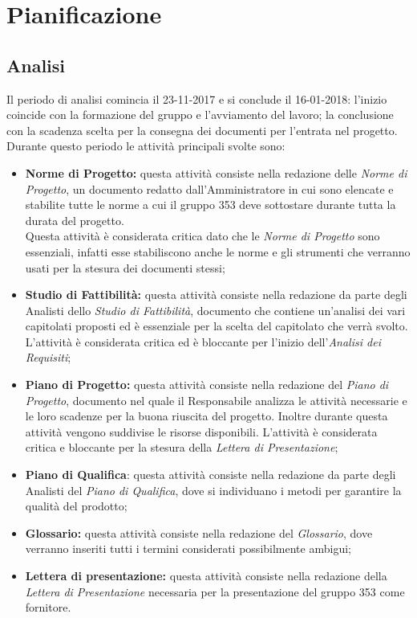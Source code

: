 \documentclass[PianoDiProgetto.tex]{subfiles}
\begin{document}
\chapter{Pianificazione}

\section{Analisi}
Il periodo di analisi comincia il 23-11-2017 e si conclude il 16-01-2018: l'inizio coincide con la formazione del gruppo e l'avviamento del lavoro; la conclusione con la scadenza scelta per la consegna dei documenti per l'entrata nel progetto. Durante questo periodo le attività principali svolte sono:
\begin{itemize}
	\item \textbf{Norme di Progetto:} questa attività consiste nella redazione delle \textit{Norme di Progetto}, un documento redatto dall'Amministratore in cui sono elencate e stabilite tutte le norme a cui il gruppo 353 deve sottostare durante tutta la durata del progetto.\\ 
	Questa attività è considerata critica dato che le \textit{Norme di Progetto} sono essenziali, infatti esse stabiliscono anche le norme e gli strumenti che verranno usati per la stesura dei documenti stessi;
	\item \textbf{Studio di Fattibilità:} questa attività consiste nella redazione da parte degli Analisti dello \textit{Studio di Fattibilità}, documento che contiene un'analisi dei vari capitolati proposti ed è essenziale per la scelta del capitolato che verrà svolto. \\
	L'attività è considerata critica ed è bloccante per l'inizio dell'\textit{Analisi dei Requisiti};
	\item \textbf{Piano di Progetto:} questa attività consiste nella redazione del \textit{Piano di Progetto}, documento nel quale il Responsabile analizza le attività necessarie e le loro scadenze per la buona riuscita del progetto. Inoltre durante questa attività vengono suddivise le risorse disponibili. L'attività è considerata critica e bloccante per la stesura della \textit{Lettera di Presentazione};
	\item \textbf{Piano di Qualifica}: questa attività consiste nella redazione da parte degli Analisti del \textit{Piano di Qualifica}, dove si individuano i metodi per garantire la qualità del prodotto;
	\item \textbf{Glossario:} questa attività consiste nella redazione del \textit{Glossario}, dove verranno inseriti tutti i termini considerati possibilmente ambigui;
	\item \textbf{Lettera di presentazione:} questa attività consiste nella redazione della \textit{Lettera di Presentazione} necessaria per la presentazione del gruppo 353 come fornitore. 	
\end{itemize}	
\end{document}
